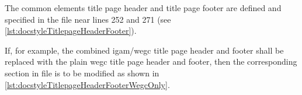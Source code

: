 
The common elements title page header and title page footer are defined and
specified in the file  near lines 252 and 271 (see
\autoref{lst:docstyleTitlepageHeaderFooter}).



If, for example, the combined \ac{igam}/\ac{wegc} title page header and
footer shall be replaced with the plain \ac{wegc} title page header and
footer, then the corresponding section in file  is to
be modified as shown in
\autoref{lst:docstyleTitlepageHeaderFooterWegcOnly}.
%
\begin{CommandLineListing}[style=DefaultFileListing, print=true, xleftmargin=0pt, gobble=2, %
  caption={Alternate definition of title page header and footer in \latexcmd{docstyle.sty}}, %
  label=lst:docstyleTitlepageHeaderFooterWegcOnly]
  \newcommand*{\Head@@ThisDocTitlePage}{%
    \upshape%
    \begin{varwidth}[b][0pt]{\paperwidth}%
      \LaTeXraggedleft%
      \Name{wegc}\\%
      \Name{ug}%
    \end{varwidth}%
    \quad%
    \begin{varwidth}[b][0pt]{\paperwidth}%
      \texttt{[image: logo-ug-medium]}%
      \hspace{2.0pt}%
      \texttt{[image: logo-wegc-medium]}%
    \end{varwidth}%
  }

  \newcommand*{\Foot@@ThisDocTitlePage}{%
    \upshape%
    \begin{varwidth}[t][0pt]{\paperwidth}%
      \LaTeXcentering%
      \Address{wegc}\\%
      \ShortName{wegc} Web\p: \WebAddress{wegc}\\%
      \ShortName{ug} Web\p: \WebAddress{ug}\\%
    \end{varwidth}%
  }
\end{CommandLineListing}


